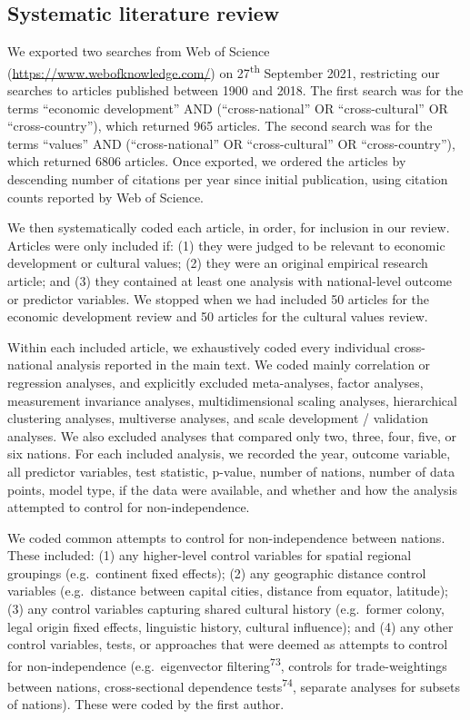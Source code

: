\documentclass[
  man,floatsintext]{apa6}
\begin{document}
\hypertarget{systematic-literature-review}{%
\subsection{Systematic literature review}\label{systematic-literature-review}}

We exported two searches from Web of Science (\url{https://www.webofknowledge.com/}) on 27\textsuperscript{th} September 2021, restricting our searches to articles published between 1900 and 2018. The first search was for the terms ``economic development'' AND (``cross-national'' OR ``cross-cultural'' OR ``cross-country''), which returned 965 articles. The second search was for the terms ``values'' AND (``cross-national'' OR ``cross-cultural'' OR ``cross-country''), which returned 6806 articles. Once exported, we ordered the articles by descending number of citations per year since initial publication, using citation counts reported by Web of Science.

We then systematically coded each article, in order, for inclusion in our review. Articles were only included if: (1) they were judged to be relevant to economic development or cultural values; (2) they were an original empirical research article; and (3) they contained at least one analysis with national-level outcome or predictor variables. We stopped when we had included 50 articles for the economic development review and 50 articles for the cultural values review.

Within each included article, we exhaustively coded every individual cross-national analysis reported in the main text. We coded mainly correlation or regression analyses, and explicitly excluded meta-analyses, factor analyses, measurement invariance analyses, multidimensional scaling analyses, hierarchical clustering analyses, multiverse analyses, and scale development / validation analyses. We also excluded analyses that compared only two, three, four, five, or six nations. For each included analysis, we recorded the year, outcome variable, all predictor variables, test statistic, p-value, number of nations, number of data points, model type, if the data were available, and whether and how the analysis attempted to control for non-independence.

We coded common attempts to control for non-independence between nations. These included: (1) any higher-level control variables for spatial regional groupings (e.g.~continent fixed effects); (2) any geographic distance control variables (e.g.~distance between capital cities, distance from equator, latitude); (3) any control variables capturing shared cultural history (e.g.~former colony, legal origin fixed effects, linguistic history, cultural influence); and (4) any other control variables, tests, or approaches that were deemed as attempts to control for non-independence (e.g.~eigenvector filtering\textsuperscript{73}, controls for trade-weightings between nations, cross-sectional dependence tests\textsuperscript{74}, separate analyses for subsets of nations). These were coded by the first author.
\end{document}
